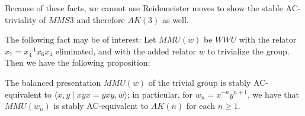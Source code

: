 Because of these facts, we cannot use Reidemeister moves to show the stable AC-triviality of $MMS3$ and therefore $AK(3)$ as well.  

The following fact may be of interest: 
Let $MMU(w)$ be $WWU$ with the relator $x_7=x_4^{-1} x_6 x_4$ eliminated, and with the added relator $w$ to trivialize the group. Then we have the following proposition: 


\begin{myprop}  The balanced presentation $MMU(w)$ of the trivial group is stably AC-equivalent to $\langle x,y \mid xyx=yxy, w\rangle$; in particular, for $w_n=x^{-n}y^{n+1}$, we have that $MMU(w_n)$ is stably AC-equivalent to
    $AK(n)$ for each $n\geq 1$. 
\end{myprop}


